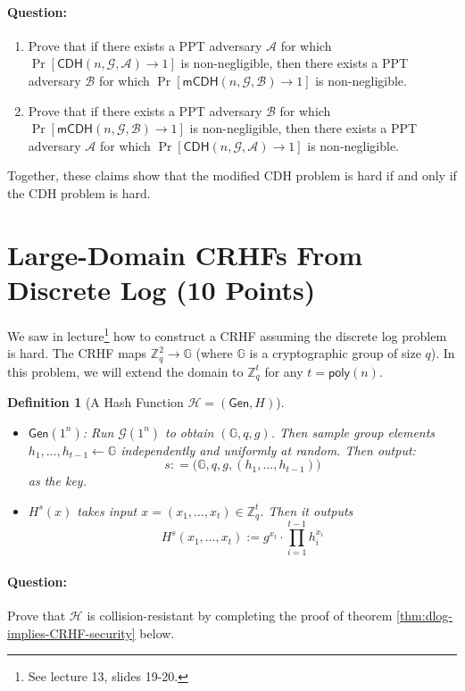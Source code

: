 \documentclass[11pt]{article}
\newtheorem{definition}[theorem]{Definition}
\numberwithin{equation}{section}
\newcommand{\Gen}{\mathsf{Gen}}
\newcommand{\gen}{\mathsf{Gen}}
\newcommand{\A}{\mathcal{A}}
\newcommand{\B}{\mathcal{B}}
\newcommand{\G}{\mathcal{G}}
\renewcommand{\H}{\mathcal{H}}
\newcommand{\GG}{\mathbb{G}}
\newcommand{\ZZ}{\mathbb{Z}}
\begin{document}
\paragraph{Question:} 
\begin{enumerate}
    \item Prove that if there exists a PPT adversary $\A$ for which $\Pr[\mathsf{CDH}(n, \G, \A) \to 1]$ is non-negligible, then there exists a PPT adversary $\B$ for which $\Pr[\mathsf{mCDH}(n, \G, \B) \to 1]$ is non-negligible.
    \item Prove that if there exists a PPT adversary $\B$ for which $\Pr[\mathsf{mCDH}(n, \G, \B) \to 1]$ is non-negligible, then there exists a PPT adversary $\A$ for which $\Pr[\mathsf{CDH}(n, \G, \A) \to 1]$ is non-negligible.
\end{enumerate}
Together, these claims show that the modified CDH problem is hard if and only if the CDH problem is hard.\\

\pagebreak

\section{Large-Domain CRHFs From Discrete Log (10 Points)}

We saw in lecture\footnote{See lecture 13, slides 19-20.} how to construct a CRHF assuming the discrete log problem is hard. The CRHF maps $\ZZ_q^2 \to \GG$ (where $\GG$ is a cryptographic group of size $q$). In this problem, we will extend the domain to $\ZZ_q^t$ for any $t = \mathsf{poly}(n)$.

\begin{definition}[A Hash Function $\H = (\Gen, H)$]
$ $
\begin{itemize}
    \item $\gen(1^n)$: Run $\G(1^n)$ to obtain $(\GG, q, g)$. Then sample group elements $h_1,\dots, h_{t-1} \gets \GG$ independently and uniformly at random. Then output: 
    \[s : = \big( \GG, q, g, (h_1,\dots, h_{t-1}) \big)\] 
    as the key.
    \item $H^s(x)$ takes input $x = (x_1, \dots, x_t) \in \ZZ_q^{t}$. Then it outputs 
    \[H^s(x_1,\dots, x_t) := g^{x_t} \cdot \prod_{i=1}^{t-1} h_i^{x_i}\]
\end{itemize}
\end{definition}

\paragraph{Question:} Prove that $\mathcal{H}$ is collision-resistant by completing the proof of theorem \ref{thm:dlog-implies-CRHF-security} below.
\end{document}

